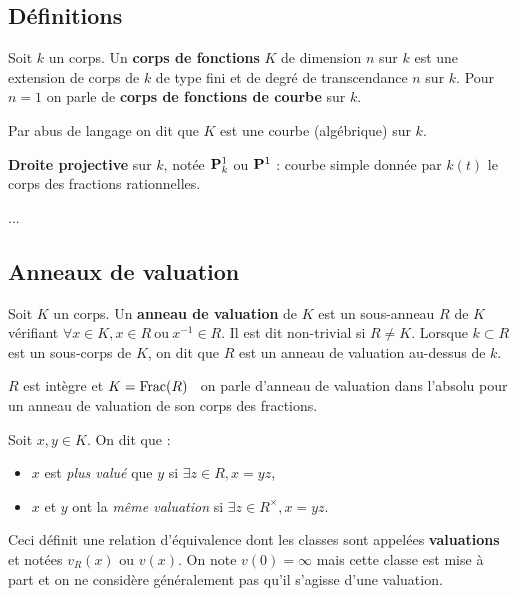 \subsection{Définitions}

	\begin{defn}
		Soit $k$ un corps.
		Un \textbf{corps de fonctions} $K$ de dimension $n$ sur $k$ est une extension de corps de $k$ de type fini et de degré de transcendance $n$ sur $k$.
		Pour $n = 1$ on parle de \textbf{corps de fonctions de courbe} sur $k$.
	\end{defn}

	Par abus de langage on dit que $K$ est une courbe (algébrique) sur $k$.
	
	\begin{defn}
		\textbf{Droite projective} sur $k$, notée $\mathbf{P}_k^1$ ou $\mathbf{P}^1$ : courbe simple donnée par $k(t)$ le corps des fractions rationnelles.
	\end{defn}
	
	...

\subsection{Anneaux de valuation}

	\begin{defn}
		Soit $K$ un corps.
		Un \textbf{anneau de valuation} de $K$ est un sous-anneau $R$ de $K$ vérifiant $\forall x \in K, x \in R\ \text{ou}\ x^{-1} \in R$.
		Il est dit non-trivial si $R \neq K$.
		Lorsque $k \subset R$ est un sous-corps de $K$, on dit que $R$ est un anneau de valuation au-dessus de $k$.
	\end{defn}

	\begin{rem}
		$R$ est intègre et $K = \operatorname{Frac}(R)$ \textrightarrow\ on parle d'anneau de valuation dans l'absolu pour un anneau de valuation de son corps des fractions.
	\end{rem}

	\begin{defn}
		Soit $x, y \in K$. On dit que :
		\begin{itemize}
			\item[\textbullet] $x$ est \textit{plus valué} que $y$ si $\exists z \in R, x = yz$,
			\item[\textbullet] $x$ et $y$ ont la  \textit{même valuation} si $\exists z \in R^\times, x = yz$.
		\end{itemize}
		Ceci définit une relation d'équivalence dont les classes sont appelées \textbf{valuations} et notées $v_R(x)$ ou $v(x)$.
		On note $v(0) = \infty$ mais cette classe est mise à part et on ne considère généralement pas qu'il s'agisse d'une valuation.
	\end{defn}

